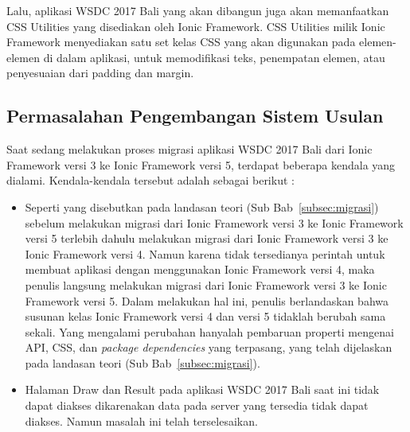 Lalu, aplikasi WSDC 2017 Bali yang akan dibangun juga akan memanfaatkan CSS Utilities yang disediakan oleh Ionic Framework. CSS Utilities milik Ionic Framework menyediakan satu set kelas CSS yang akan digunakan pada elemen-elemen di dalam aplikasi, untuk memodifikasi teks, penempatan elemen, atau penyesuaian dari padding dan margin.

\subsection{Permasalahan Pengembangan Sistem Usulan}
\label{sec:analisisPermasalahanSistemKini}
Saat sedang melakukan proses migrasi aplikasi WSDC 2017 Bali dari Ionic Framework versi 3 ke Ionic Framework versi 5, terdapat beberapa kendala yang dialami. Kendala-kendala tersebut adalah sebagai berikut : 
\begin{itemize}
	\item Seperti yang disebutkan pada landasan teori (Sub Bab~\ref{subsec:migrasi}) sebelum melakukan migrasi dari Ionic Framework versi 3 ke Ionic Framework versi 5 terlebih dahulu melakukan migrasi dari Ionic Framework versi 3 ke Ionic Framework versi 4. Namun karena tidak tersedianya perintah untuk membuat aplikasi dengan menggunakan Ionic Framework versi 4, maka penulis langsung melakukan migrasi dari Ionic Framework versi 3 ke Ionic Framework versi 5. Dalam melakukan hal ini, penulis berlandaskan bahwa susunan kelas Ionic Framework versi 4 dan versi 5 tidaklah berubah sama sekali. Yang mengalami perubahan hanyalah pembaruan properti mengenai API, CSS, dan {\it package dependencies} yang terpasang, yang telah dijelaskan pada landasan teori (Sub Bab~\ref{subsec:migrasi}).
	\item Halaman Draw dan Result pada aplikasi WSDC 2017 Bali saat ini tidak dapat diakses dikarenakan data pada server yang tersedia tidak dapat diakses. Namun masalah ini telah terselesaikan.
\end{itemize}
